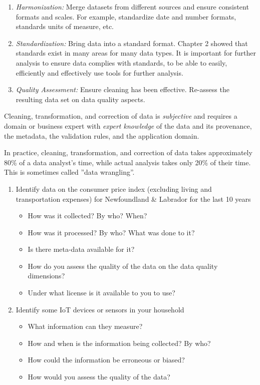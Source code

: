\begin{enumerate}
\item \emph{Harmonization:} Merge datasets from different sources and ensure consistent formats and scales. For example, standardize date and number formats, standards units of measure, etc.

\item \emph{Standardization:} Bring data into a standard format. Chapter 2 showed that standards exist in many areas for many data types. It is important for further analysis to ensure data complies with standards, to be able to easily, efficiently and effectively use tools for further analysis. 

\item \emph{Quality Assessment:} Ensure cleaning has been effective. Re-assess the resulting data set on data quality aspects.
\end{enumerate}

\begin{infobox}
Cleaning, transformation, and correction of data is \emph{subjective} and requires a domain or business expert with  \emph{expert knowledge} of the data and its provenance, the metadata, the validation rules, and the application domain.
\end{infobox}

\begin{infobox}
In practice, cleaning, transformation, and correction of data takes approximately 80\% of a data analyst's time, while actual analysis takes only 20\% of their time. This is sometimes called ''data wrangling''.
\end{infobox}


\begin{exerciseboxcomputer}
\begin{enumerate}
	\item Identify data on the consumer price index (excluding living and transportation expenses) for Newfoundland \& Labrador for the last 10 years
	\begin{itemize}
		\item How was it collected? By who? When?
		\item How was it processed? By who? What was done to it?
		\item Is there meta-data available for it?
		\item How do you assess the quality of the data on the data quality dimensions?
		\item Under what license is it available to you to use?
	\end{itemize}
	\item Identify some IoT devices or sensors in your household
	\begin{itemize}
		\item What information can they measure?
		\item How and when is the information being collected? By who?
		\item How could the information be erroneous or biased?
		\item How would you assess the quality of the data?
	\end{itemize}
\end{enumerate}
\end{exerciseboxcomputer}

